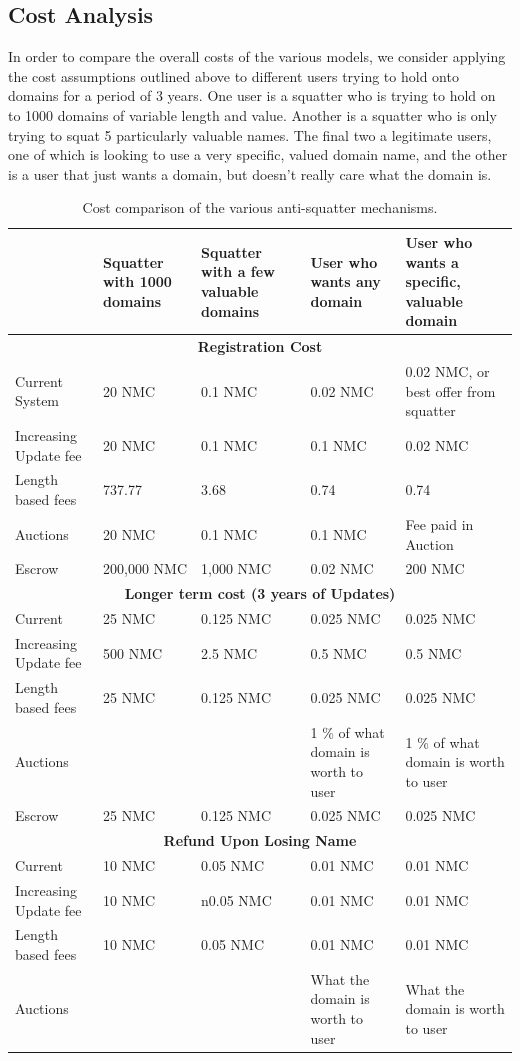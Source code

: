 \subsection{Cost Analysis}
    In order to compare the overall costs of the various models, we consider applying the cost assumptions outlined above to different users trying to hold onto domains for a period of 3 years. One user is a squatter who is trying to hold on to 1000 domains of variable length and value. Another is a squatter who is only trying to squat 5 particularly valuable names. The final two a legitimate users, one of which is looking to use a very specific, valued domain name, and the other is a user that just wants a domain, but doesn't really care what the domain is.


\begin{table}[t]
  \centering
  \begin{tabularx}{\linewidth}{| X | X | X | X | X |} \hline
    &  Squatter with 1000 domains & Squatter with a few valuable domains & User who wants any domain & User who wants a specific, valuable domain\\
\hline
    \multicolumn{5}{|c|}{\textbf{Registration Cost}} \\ \hline
Current System &  20 NMC & 0.1 NMC & 0.02 NMC & 0.02 NMC, or best offer from squatter \\
Increasing Update fee & 20 NMC & 0.1 NMC & 0.1 NMC & 0.02 NMC \\
Length based fees & 737.77 & 3.68 & 0.74 & 0.74 \\ 
Auctions & 20 NMC & 0.1 NMC & 0.1 NMC & Fee paid in Auction \\
Escrow & 200,000 NMC & 1,000 NMC & 0.02 NMC & 200 NMC \\ \hline

\multicolumn{5}{|c|}{\textbf{Longer term cost (3 years of Updates)}} \\ \hline
Current & 25 NMC & 0.125 NMC & 0.025 NMC & 0.025 NMC \\ 
Increasing Update fee & 500 NMC & 2.5 NMC & 0.5 NMC & 0.5 NMC \\ 
Length based fees & 25 NMC & 0.125 NMC & 0.025 NMC & 0.025 NMC \\ 
Auctions & & & 1 \% of what domain is worth to user & 1 \% of what domain is worth to user \\ 
Escrow & 25 NMC & 0.125 NMC & 0.025 NMC & 0.025 NMC \\ \hline

\multicolumn{5}{|c|}{\textbf{Refund Upon Losing Name}} \\ \hline
Current & 10 NMC & 0.05 NMC & 0.01 NMC & 0.01 NMC \\
Increasing Update fee & 10 NMC & n0.05 NMC & 0.01 NMC & 0.01 NMC \\
Length based fees & 10 NMC & 0.05 NMC & 0.01 NMC & 0.01 NMC \\
Auctions & & & What the domain is worth to user & What the domain is worth to user \\ \hline
  \end{tabularx}
  \caption{Cost comparison of the various anti-squatter mechanisms.}
\end{table}


